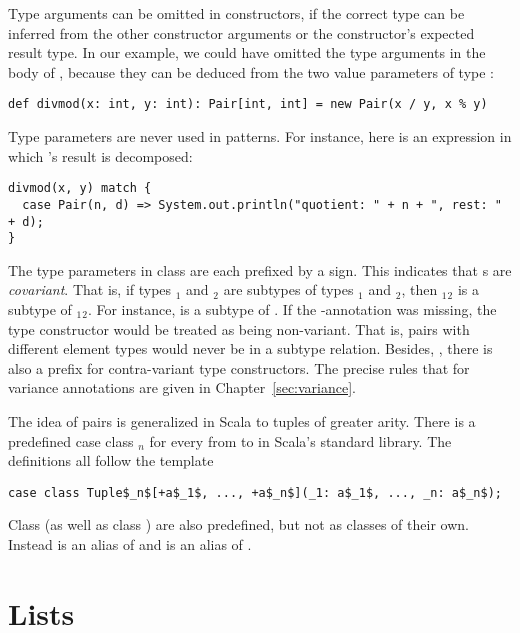 \documentclass[a4paper,12pt,twoside,titlepage]{book}
\begin{document}
Type arguments can be omitted in constructors, if the correct type can
be inferred from the other constructor arguments or the constructor's
expected result type. In our example, we could have omitted the type
arguments in the body of , because they can be deduced
from the two value parameters of type :
\begin{lstlisting}
def divmod(x: int, y: int): Pair[int, int] = new Pair(x / y, x % y)
\end{lstlisting}
Type parameters are never used in patterns. For instance, here is an
expression in which 's result is decomposed:
\begin{lstlisting}
divmod(x, y) match {
  case Pair(n, d) => System.out.println("quotient: " + n + ", rest: " + d);
}
\end{lstlisting}
The type parameters in class  are each prefixed by a
\code{+} sign.  This indicates that s are {\em
covariant}. That is, if types $_1$ and $_2$ are
subtypes of types $_1$ and $_2$, then
\code{Pair[T}$_1$$_2$\code{]} is a subtype of
\code{Pair[S}$_1$$_2$\code{]}. For instance,
 is a
subtype of . If the \code{+}-annotation was
missing, the type constructor would be treated as being
non-variant. That is, pairs with different element types would never
be in a subtype relation. 
Besides, \code{+}, there is also a prefix
\code{-} for contra-variant type constructors. 
The precise rules that
for variance annotations are given in Chapter~\ref{sec:variance}.

The idea of pairs is generalized in Scala to tuples of greater arity.
There is a predefined case class $_n$ for every 
from  to  in Scala's standard library. The
definitions all follow the template
\begin{lstlisting}
case class Tuple$_n$[+a$_1$, ..., +a$_n$](_1: a$_1$, ..., _n: a$_n$);
\end{lstlisting}
Class  (as well as class ) are also
predefined, but not as classes of their own. Instead 
 is an alias of  and  is an
alias of . 

\chapter{Lists}
\end{document}
